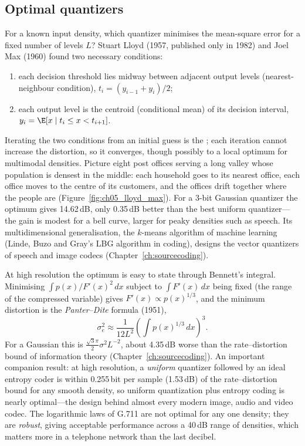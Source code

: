 \subsection{Optimal quantizers}

For a known input density, which quantizer minimises the mean-square error for a fixed number
of levels $L$? Stuart Lloyd (1957, published only in 1982) and Joel Max (1960) found two
necessary conditions:
\begin{enumerate}
\item each decision threshold lies midway between adjacent output levels (nearest-neighbour
condition), $t_i=(y_{i-1}+y_i)/2$;
\item each output level is the centroid (conditional mean) of its decision interval,
$y_i=\E[x\mid t_i\le x<t_{i+1}]$.
\end{enumerate}
Iterating the two conditions from an initial guess is the ; each
iteration cannot increase the distortion, so it converges, though possibly to a local optimum
for multimodal densities. Picture eight post offices serving a long valley whose population is
densest in the middle: each household goes to its nearest office, each office moves to the centre
of its customers, and the offices drift together where the people are
(Figure~\ref{fig:ch05_lloyd_max}). For a 3-bit Gaussian quantizer the optimum gives 14.62\,dB, only
0.35\,dB better than the best uniform quantizer---the gain is modest for a bell curve, larger for
peaky densities such as speech. Its multidimensional generalisation, the $k$-means algorithm of
machine learning (Linde, Buzo and Gray's LBG algorithm in coding), designs the vector quantizers
of speech and image codecs (Chapter~\ref{ch:sourcecoding}).


At high resolution the optimum is easy to state through Bennett's integral. Minimising
$\int p(x)/F'(x)^2\,dx$ subject to $\int F'(x)\,dx$ being fixed (the range of the compressed
variable) gives $F'(x)\propto p(x)^{1/3}$, and the minimum distortion is the
\emph{Panter--Dite} formula (1951),
\begin{equation}
\sigma_e^2\approx\frac{1}{12L^2}\left(\int p(x)^{1/3}\,dx\right)^3.
\label{eq:ch05:panterdite}
\end{equation}
For a Gaussian this is $\frac{\sqrt3\pi}{2}\sigma^2L^{-2}$, about 4.35\,dB worse than the
rate--distortion bound of information theory (Chapter~\ref{ch:sourcecoding}). An important
companion result: at high resolution, a \emph{uniform} quantizer followed by an ideal entropy
coder is within 0.255\,bit per sample (1.53\,dB) of the rate--distortion bound for any smooth
density, so uniform quantization plus entropy coding is nearly optimal---the design behind
almost every modern image, audio and video codec. The logarithmic laws of G.711 are not
optimal for any one density; they are \emph{robust}, giving acceptable performance across a
40\,dB range of densities, which matters more in a telephone network than the last decibel.

